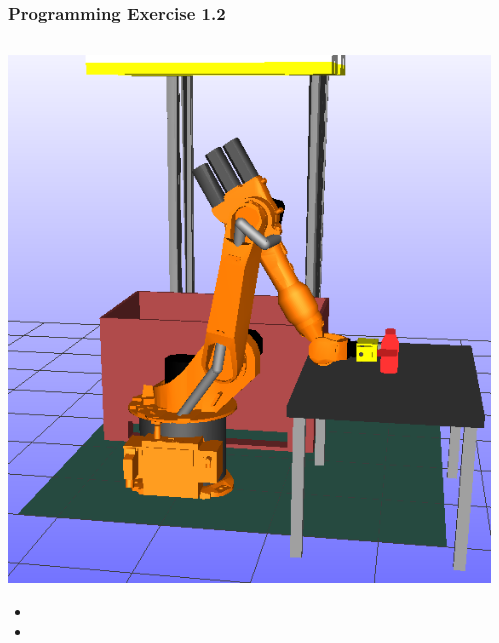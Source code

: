 \documentclass{beamer}
\begin{document}
\begin{frame}
  \frametitle{Programming Exercise 1.2}
  \begin{columns}
    \begin{column}{0.5\textwidth}
      \begin{center}
        \includegraphics[height=0.5\textheight]{./graphics/ex22sol1}
        \begin{itemize}
        \item {} %
        \item {} %
        \end{itemize}
      \end{center}
    \end{column}
    \begin{column}{0.5\textwidth}
      \begin{center}

\end{center}
\end{column}
\end{columns}
\end{frame}
\end{document}
